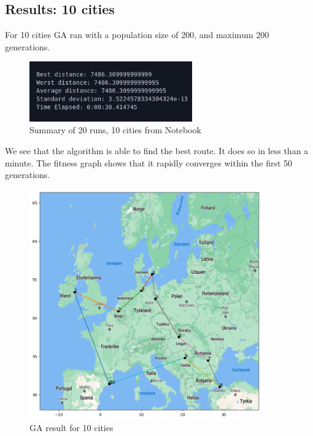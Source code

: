 \documentclass{article}
\begin{document}
    \newpage

    \subsection{Results: 10 cities}

    For 10 cities GA ran with a population size of 200, and maximum 200 generations.

    \begin{figure}[ht!]
        \includegraphics[width=7cm]{images/ga_10_cities_summary.png}
        \centering
        \caption{Summary of 20 runs, 10 cities from Notebook}
    \end{figure}

    We see that the algorithm is able to find the best route. It does so in less than a minute.
    The fitness graph shows that it rapidly converges within the first 50 generations.

    \begin{figure}[ht!]
        \includegraphics[width=10cm]{images/ga_10_cities.png}
        \centering
        \caption{GA result for 10 cities}
    \end{figure}
\end{document}
